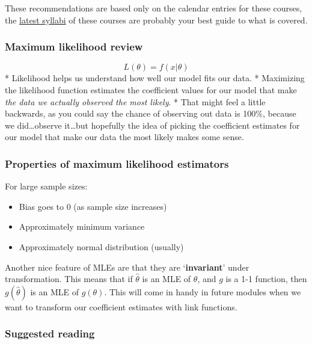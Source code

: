 \documentclass[
  openany]{book}
\providecommand{\tightlist}{%
  \setlength{\itemsep}{0pt}\setlength{\parskip}{0pt}}
\begin{document}
These recommendations are based only on the calendar entries for these courses, the \href{https://www.statistics.utoronto.ca/resources/past-courses-outlines}{latest syllabi} of these courses are probably your best guide to what is covered.

\hypertarget{maximum-likelihood-review}{%
\subsubsection{Maximum likelihood review}\label{maximum-likelihood-review}}

\[L(\theta) = f(x | \theta) \]
* Likelihood helps us understand how well our model fits our data.
* Maximizing the likelihood function estimates the coefficient values for our model that make \emph{the data we actually observed the most likely}.
* That might feel a little backwards, as you could say the chance of observing out data is 100\%, because we did\ldots observe it\ldots but hopefully the idea of picking the coefficient estimates for our model that make our data the most likely makes some sense.

\hypertarget{properties-of-maximum-likelihood-estimators}{%
\subsubsection{Properties of maximum likelihood estimators}\label{properties-of-maximum-likelihood-estimators}}

For large sample sizes:

\begin{itemize}
\tightlist
\item
  Bias goes to 0 (as sample size increases)\\
\item
  Approximately minimum variance\\
\item
  Approximately normal distribution (usually)
\end{itemize}

Another nice feature of MLEs are that they are `\textbf{invariant}' under transformation. This means that if \(\hat\theta\) is an MLE of \(\theta\), and \(g\) is a 1-1 function, then \(g(\hat\theta)\) is an MLE of \(g(\theta)\). This will come in handy in future modules when we want to transform our coefficient estimates with link functions.

\hypertarget{suggested-reading}{%
\subsubsection{Suggested reading}\label{suggested-reading}}
\end{document}
